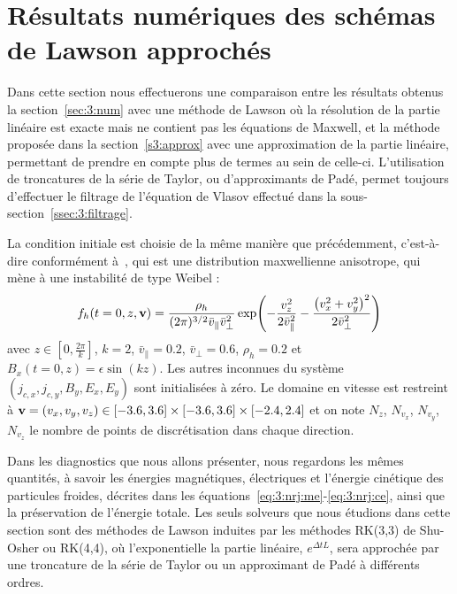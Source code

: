 
\section{Résultats numériques des schémas de Lawson approchés}
\label{s:3:num_m}

Dans cette section nous effectuerons une comparaison entre les résultats obtenus la section~\ref{sec:3:num} avec une méthode de Lawson où la résolution de la partie linéaire est exacte mais ne contient pas les équations de Maxwell, et la méthode proposée dans la section~\ref{s3:approx} avec une approximation de la partie linéaire, permettant de prendre en compte plus de termes au sein de celle-ci. L'utilisation de troncatures de la série de Taylor, ou d'approximants de Padé, permet toujours d'effectuer le filtrage de l'équation de Vlasov effectué dans la sous-section~\ref{ssec:3:filtrage}.

La condition initiale est choisie de la même manière que précédemment, c'est-à-dire conformément à~\cite{Holderied:2020}, qui est une distribution maxwellienne anisotrope, qui mène à une instabilité de type Weibel :
$$
  f_h(t=0,z,\vb{v}) = \frac{\rho_h}{(2\pi)^{3/2}\bar{v}_{\|}\bar{v}_\perp^2}\exp( - \frac{v_z^2}{2\bar{v}_{\|}^2} - \frac{\left( v_x^2 + v_y^2 \right)^2}{2\bar{v}_\perp^2} )
$$
avec $z\in[0,\frac{2\pi}{k}]$, $k=2$, $\bar{v}_{\|}=0.2$, $\bar{v}_\perp=0.6$, $\rho_h=0.2$ et $B_x(t=0,z)=\epsilon\sin(kz)$. Les autres inconnues du système $(j_{c,x},j_{c,y},B_y,E_x,E_y)$ sont initialisées à zéro. Le domaine en vitesse est restreint à $\vb{v}=(v_x,v_y,v_z)\in[-3.6,3.6]\times[-3.6,3.6]\times[-2.4,2.4]$ et on note $N_z$, $N_{v_x}$, $N_{v_y}$, $N_{v_z}$ le nombre de points de discrétisation dans chaque direction.

Dans les diagnostics que nous allons présenter, nous regardons les mêmes quantités, à savoir les énergies magnétiques, électriques et l'énergie cinétique des particules froides, décrites dans les équations~\eqref{eq:3:nrj:me}-\eqref{eq:3:nrj:ce}, ainsi que la préservation de l'énergie totale. Les seuls solveurs que nous étudions dans cette section sont des méthodes de Lawson induites par les méthodes RK(3,3) de Shu-Osher ou RK(4,4), où l'exponentielle la partie linéaire, $e^{\Delta tL}$, sera approchée par une troncature de la série de Taylor ou un approximant de Padé à différents ordres.


